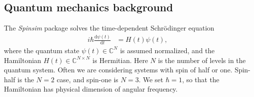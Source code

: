 \documentclass{jors}
\newcommand{\supervisordisagreement}[2]{\textcolor{green}{\texttt{{Supervisor disagreement!!! <<<<<<< Lincoln}}} \textcolor{blue}{#1} \textcolor{green}{\texttt{=======}} \textcolor{red}{#2} \textcolor{green}{\texttt{>>>>>>> James}}}
\begin{document}
	\subsection{Quantum mechanics background}
		The \emph{Spinsim} package solves the time-dependent Schr\"{o}dinger equation
		\begin{align}
			i\hbar\frac{\mathrm{d}\psi(t)}{\mathrm{d}t} &= H(t)\psi(t),\label{eq:schroedinger}
		\end{align}
		where the quantum state $ \psi(t) \in \mathbb{C}^N $ is assumed normalized, and the Hamiltonian $ H(t) \in \mathbb{C}^{N \times N} $ is Hermitian.
		Here $ N $ is the number of levels in the quantum system.
		Often we are considering systems with spin of half or one.
		Spin-half is the $ N = 2 $ case, and spin-one is $ N = 3 $.
		We set $ \hbar = 1 $, so that the Hamiltonian has physical dimension of angular frequency.
		
		
\end{document}
